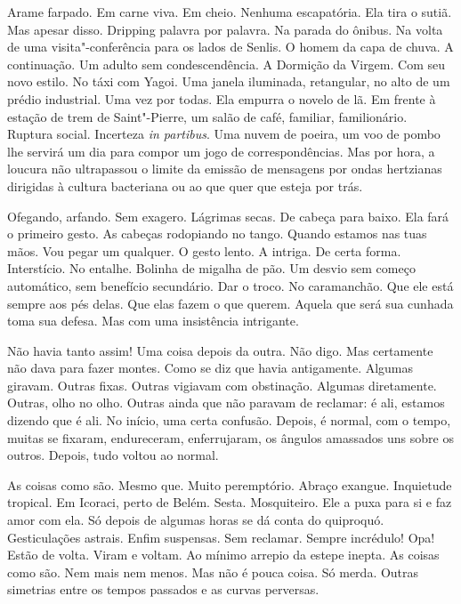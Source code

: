Arame farpado. Em carne viva. Em cheio. Nenhuma escapatória. Ela tira o
sutiã. Mas apesar disso. Dripping palavra por palavra. Na parada do
ônibus. Na volta de uma visita"-conferência para os lados de Senlis. O
homem da capa de chuva. A continuação. Um adulto sem condescendência. A
Dormição da Virgem. Com seu novo estilo. No táxi com Yagoi. Uma janela
iluminada, retangular, no alto de um prédio industrial. Uma vez por
todas. Ela empurra o novelo de lã. Em frente à estação de trem de
Saint"-Pierre, um salão de café, familiar, familionário. Ruptura social.
Incerteza \emph{in partibus}. Uma nuvem de poeira, um voo de pombo lhe
servirá um dia para compor um jogo de correspondências. Mas por hora, a
loucura não ultrapassou o limite da emissão de mensagens por ondas
hertzianas dirigidas à cultura bacteriana ou ao que quer que esteja por
trás.

Ofegando, arfando. Sem exagero. Lágrimas secas. De cabeça para baixo.
Ela fará o primeiro gesto. As cabeças rodopiando no tango. Quando
estamos nas tuas mãos. Vou pegar um qualquer. O gesto lento. A intriga.
De certa forma. Interstício. No entalhe. Bolinha de migalha de pão. Um
desvio sem começo automático, sem benefício secundário. Dar o troco. No
caramanchão. Que ele está sempre aos pés delas. Que elas fazem o que
querem. Aquela que será sua cunhada toma sua defesa. Mas com uma
insistência intrigante.

Não havia tanto assim! Uma coisa depois da outra. Não digo. Mas
certamente não dava para fazer montes. Como se diz que havia
antigamente. Algumas giravam. Outras fixas. Outras vigiavam com
obstinação. Algumas diretamente. Outras, olho no olho. Outras ainda que
não paravam de reclamar: é ali, estamos dizendo que é ali. No início,
uma certa confusão. Depois, é normal, com o tempo, muitas se fixaram,
endureceram, enferrujaram, os ângulos amassados uns sobre os outros.
Depois, tudo voltou ao normal.

As coisas como são. Mesmo que. Muito peremptório. Abraço exangue.
Inquietude tropical. Em Icoraci, perto de Belém. Sesta. Mosquiteiro. Ele
a puxa para si e faz amor com ela. Só depois de algumas horas se dá
conta do quiproquó. Gesticulações astrais. Enfim suspensas. Sem
reclamar. Sempre incrédulo! Opa! Estão de volta. Viram e voltam. Ao
mínimo arrepio da estepe inepta. As coisas como são. Nem mais nem menos.
Mas não é pouca coisa. Só merda. Outras simetrias entre os tempos
passados e as curvas perversas.

